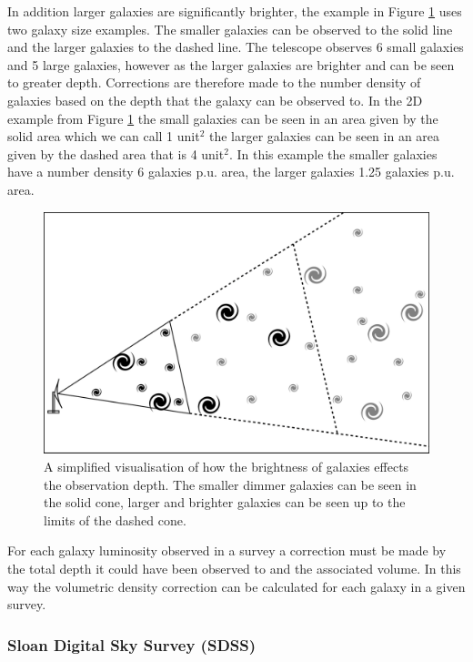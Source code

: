 In addition larger galaxies are significantly brighter, the example in Figure \ref{fig:Vmax} uses two galaxy size examples. The smaller galaxies can be observed to the solid line and the larger galaxies to the dashed line. The telescope observes 6 small galaxies and 5 large galaxies, however as the larger galaxies are brighter and can be seen to greater depth. Corrections are therefore made to the number density of galaxies based on the depth that the galaxy can be observed to. In the 2D example from Figure \ref{fig:Vmax} the small galaxies can be seen in an area given by the solid area which we can call 1 unit$^2$ the larger galaxies can be seen in an area given by the dashed area that is 4 unit$^2$. In this example the smaller galaxies have a number density 6 galaxies p.u. area, the larger galaxies 1.25 galaxies p.u. area.

\begin{figure}[h]
    \centering
    \includegraphics[width = \linewidth]{Figures/Chapter1/Vmax_Toon.png}
    \caption{A simplified visualisation of how the brightness of galaxies effects the observation depth. The smaller dimmer galaxies can be seen in the solid cone, larger and brighter galaxies can be seen up to the limits of the dashed cone.}
    \label{fig:Vmax}
\end{figure}

For each galaxy luminosity observed in a survey a correction must be made by the total depth it could have been observed to and the associated volume. In this way the volumetric density correction can be calculated for each galaxy in a given survey.

\subsubsection{Sloan Digital Sky Survey (SDSS)}

